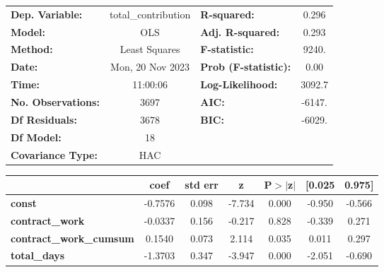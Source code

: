 \begin{center}
\begin{tabular}{lclc}
\toprule
\textbf{Dep. Variable:}                     & total\_contribution & \textbf{  R-squared:         } &     0.296   \\
\textbf{Model:}                             &         OLS         & \textbf{  Adj. R-squared:    } &     0.293   \\
\textbf{Method:}                            &    Least Squares    & \textbf{  F-statistic:       } &     9240.   \\
\textbf{Date:}                              &   Mon, 20 Nov 2023  & \textbf{  Prob (F-statistic):} &     0.00    \\
\textbf{Time:}                              &       11:00:06      & \textbf{  Log-Likelihood:    } &    3092.7   \\
\textbf{No. Observations:}                  &          3697       & \textbf{  AIC:               } &    -6147.   \\
\textbf{Df Residuals:}                      &          3678       & \textbf{  BIC:               } &    -6029.   \\
\textbf{Df Model:}                          &            18       & \textbf{                     } &             \\
\textbf{Covariance Type:}                   &         HAC         & \textbf{                     } &             \\
\bottomrule
\end{tabular}
\begin{tabular}{lcccccc}
                                            & \textbf{coef} & \textbf{std err} & \textbf{z} & \textbf{P$> |$z$|$} & \textbf{[0.025} & \textbf{0.975]}  \\
\midrule
\textbf{const}                              &      -0.7576  &        0.098     &    -7.734  &         0.000        &       -0.950    &       -0.566     \\
\textbf{contract\_work}                     &      -0.0337  &        0.156     &    -0.217  &         0.828        &       -0.339    &        0.271     \\
\textbf{contract\_work\_cumsum}             &       0.1540  &        0.073     &     2.114  &         0.035        &        0.011    &        0.297     \\
\textbf{total\_days}                        &      -1.3703  &        0.347     &    -3.947  &         0.000        &       -2.051    &       -0.690     \\

\end{tabular}
\end{center}
